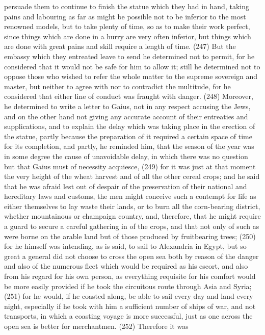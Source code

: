 persuade them to continue to finish the statue which they had in hand, taking pains and labouring
as far as might be possible not to be inferior to the most renowned models, but to take plenty of
time, so as to make their work perfect, since things which are done in a hurry are very often
inferior, but things which are done with great pains and skill require a length of time. (247) But the
embassy which they entreated leave to send he determined not to permit, for he considered that it
would not be safe for him to allow it; still he determined not to oppose those who wished to refer the
whole matter to the supreme sovereign and master, but neither to agree with nor to contradict the
multitude, for he considered that either line of conduct was fraught with danger. (248) Moreover, he
determined to write a letter to Gaius, not in any respect accusing the Jews, and on the other hand
not giving any accurate account of their entreaties and supplications, and to explain the delay
which was taking place in the erection of the statue, partly because the preparation of it required a
certain space of time for its completion, and partly, he reminded him, that the season of the year
was in some degree the cause of unavoidable delay, in which there was no question but that Gaius
must of necessity acquiesce, (249) for it was just at that moment the very height of the wheat
harvest and of all the other cereal crops; and he said that he was afraid lest out of despair of the
preservation of their national and hereditary laws and customs, the men might conceive such a
contempt for life as either themselves to lay waste their lands, or to burn all the corn-bearing
district, whether mountainous or champaign country, and, therefore, that he might require a guard
to secure a careful gathering in of the crops, and that not only of such as were borne on the arable
land but of those produced by fruitbearing trees; (250) for he himself was intending, as is said, to
sail to Alexandria in Egypt, but so great a general did not choose to cross the open sea both by
reason of the danger and also of the numerous fleet which would be required as his escort, and
also from his regard for his own person, as everything requisite for his comfort would be more
easily provided if he took the circuitous route through Asia and Syria; (251) for he would, if he
coasted along, be able to sail every day and land every night, especially if he took with him a
sufficient number of ships of war, and not transports, in which a coasting voyage is more
successful, just as one across the open sea is better for merchantmen. (252) Therefore it was
